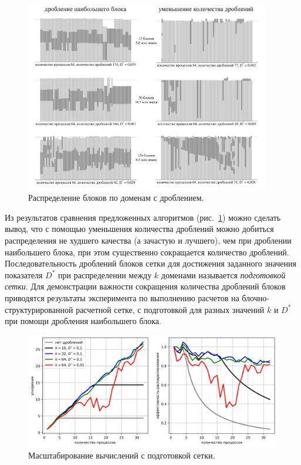 \documentclass[a4paper,14pt]{extarticle}                     %
\theoremstyle{plain}                                         %
\begin{document}
\begin{figure}[!ht]
\centering
\includegraphics[width=0.95\textwidth]{./fig/par_distr_with_cut.pdf}
\singlespacing
\caption{Распределение блоков по доменам с дроблением.}
\label{fig:par_distr_with_cut}
\end{figure}

Из результатов сравнения предложенных алгоритмов (рис.~\ref{fig:par_distr_with_cut}) можно сделать вывод, что с помощью уменьшения количества дроблений можно добиться распределения не худшего качества (а зачастую и лучшего), чем при дроблении наибольшего блока,
при этом существенно сокращается количество дроблений.
Последовательность дроблений блоков сетки для достижения заданного значения показателя $D^{*}$ при распределении между $k$ доменами называется \textit{подготовкой сетки}.
Для демонстрации важности сокращения количества дроблений блоков приводятся результаты эксперимента по выполнению расчетов на блочно-структурированной расчетной сетке, с подготовкой для разных значений $k$ и $D^{*}$ при помощи дробления наибольшего блока.

\begin{figure}[ht]
\centering
\includegraphics[width=1.0\textwidth]{./fig/par_scaling_with_prepare.png}
\singlespacing
\caption{Масштабирование вычислений с подготовкой сетки.}
\label{fig:par_scaling_with_prepare}
\end{figure}
\end{document}
